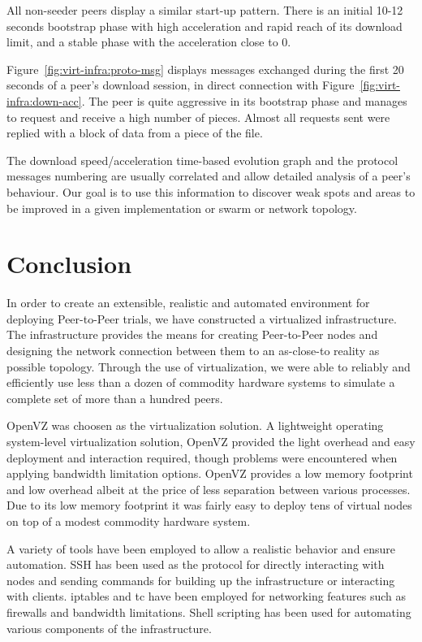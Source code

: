 All non-seeder peers display a similar start-up pattern. There is an initial
10-12 seconds bootstrap phase with high acceleration and rapid reach of its
download limit, and a stable phase with the acceleration close to 0.

Figure~\ref{fig:virt-infra:proto-msg} displays messages exchanged during the
first 20 seconds of a peer's download session, in direct connection with
Figure~\ref{fig:virt-infra:down-acc}. The peer is quite aggressive in its
bootstrap phase and manages to request and receive a high number of pieces.
Almost all requests sent were replied with a block of data from a piece of the
file.

The download speed/acceleration time-based evolution graph and the protocol
messages numbering are usually correlated and allow detailed analysis of a
peer's behaviour. Our goal is to use this information to discover weak spots
and areas to be improved in a given implementation or swarm or network
topology.

\section{Conclusion}
\label{sec:virt-infra:conclusion}

In order to create an extensible, realistic and automated environment for
deploying Peer-to-Peer trials, we have constructed a virtualized
infrastructure. The infrastructure provides the means for creating
Peer-to-Peer nodes and designing the network connection between them to an
as-close-to reality as possible topology. Through the use of virtualization,
we were able to reliably and efficiently use less than a dozen of commodity
hardware systems to simulate a complete set of more than a hundred peers.

OpenVZ was choosen as the virtualization solution. A lightweight operating
system-level virtualization solution, OpenVZ provided the light overhead and
easy deployment and interaction required, though problems were encountered
when applying bandwidth limitation options. OpenVZ provides a low memory
footprint and low overhead albeit at the price of less separation between
various processes. Due to its low memory footprint it was fairly easy to
deploy tens of virtual nodes on top of a modest commodity hardware system.

A variety of tools have been employed to allow a realistic behavior and ensure
automation. SSH has been used as the protocol for directly interacting with
nodes and sending commands for building up the infrastructure or interacting
with clients. iptables and tc have been employed for networking features such
as firewalls and bandwidth limitations. Shell scripting has been used for
automating various components of the infrastructure.

